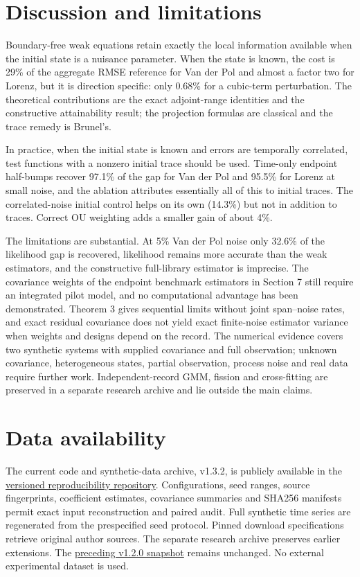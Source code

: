 \documentclass[ejs]{imsart}
\begin{document}
\section{Discussion and
limitations}\label{discussion-and-limitations}

Boundary-free weak equations retain exactly the local information
available when the initial state is a nuisance parameter. When the state
is known, the cost is 29\% of the aggregate RMSE reference for Van der
Pol and almost a factor two for Lorenz, but it is direction specific:
only 0.68\% for a cubic-term perturbation. The theoretical contributions
are the exact adjoint-range identities and the constructive
attainability result; the projection formulas are classical and the
trace remedy is Brunel's.

In practice, when the initial state is known and errors are temporally
correlated, test functions with a nonzero initial trace should be used.
Time-only endpoint half-bumps recover 97.1\% of the gap for Van der Pol
and 95.5\% for Lorenz at small noise, and the ablation attributes
essentially all of this to initial traces. The correlated-noise initial
control helps on its own (14.3\%) but not in addition to traces. Correct
OU weighting adds a smaller gain of about 4\%.

The limitations are substantial. At 5\% Van der Pol noise only 32.6\% of
the likelihood gap is recovered, likelihood remains more accurate than
the weak estimators, and the constructive full-library estimator is
imprecise. The covariance weights of the endpoint benchmark estimators
in Section 7 still require an integrated pilot model, and no
computational advantage has been demonstrated. Theorem 3 gives
sequential limits without joint span--noise rates, and exact residual
covariance does not yield exact finite-noise estimator variance when
weights and designs depend on the record. The numerical evidence covers
two synthetic systems with supplied covariance and full observation;
unknown covariance, heterogeneous states, partial observation, process
noise and real data require further work. Independent-record GMM,
fission and cross-fitting are preserved in a separate research archive
and lie outside the main claims.

\section*{Data availability}\label{data-availability}

The current code and synthetic-data archive, v1.3.2, is publicly
available in the
\href{https://github.com/malyshevdanil/wsindy-information-limits/tree/v1.3.2}{versioned
reproducibility repository}. Configurations, seed ranges, source
fingerprints, coefficient estimates, covariance summaries and SHA256
manifests permit exact input reconstruction and paired audit. Full
synthetic time series are regenerated from the prespecified seed
protocol. Pinned download specifications retrieve original author
sources. The separate research archive preserves earlier extensions. The
\href{https://doi.org/10.5281/zenodo.23313935}{preceding v1.2.0
snapshot} remains unchanged. No external experimental dataset is used.
\end{document}
